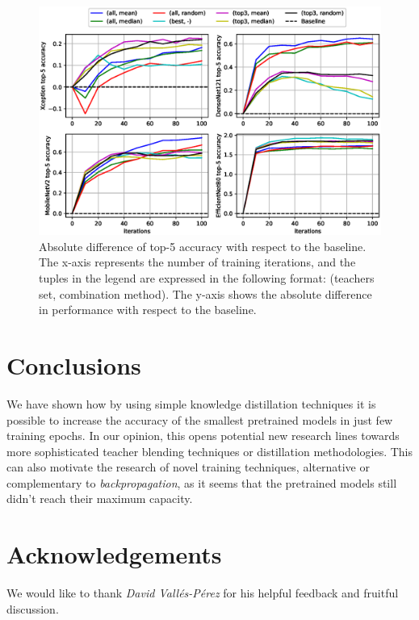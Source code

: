 \documentclass{elsarticle}
\begin{document}
			
	\begin{figure}[h!]
		\centering
		\includegraphics[width=1\linewidth]{img/top5_curves}
		\caption{Absolute difference of top-5 accuracy with respect to the baseline. The x-axis represents the number of training iterations, and the tuples in the legend are expressed in the following format: (teachers set, combination method). The y-axis shows the absolute difference in performance with respect to the baseline.}
		\label{fig:top5curves}
	\end{figure}
	
	\section{Conclusions}  \label{sec:conclusions}
	We have shown how by using simple knowledge distillation techniques it is possible to increase the accuracy of the smallest pretrained models in just few training epochs. In our opinion, this opens potential new research lines towards more sophisticated teacher blending techniques or distillation methodologies. This can also motivate the research of novel training techniques, alternative or complementary to \textit{backpropagation}, as it seems that the pretrained models still didn't reach their maximum capacity.
	
	
	\section{Acknowledgements}
	We would like to thank \textit{David Vallés-Pérez} for his helpful feedback and fruitful discussion.
	\newpage
	
	
	
	
\end{document}

